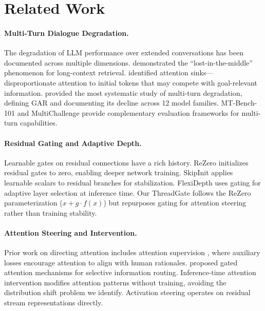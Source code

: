 \documentclass[11pt,a4paper]{article}
\begin{document}
\section{Related Work}
\label{sec:related}

\paragraph{Multi-Turn Dialogue Degradation.}
The degradation of LLM performance over extended conversations has been documented across multiple dimensions.
\citet{liu2024lost} demonstrated the ``lost-in-the-middle'' phenomenon for long-context retrieval.
\citet{xiao2024efficient} identified attention sinks---disproportionate attention to initial tokens that may compete with goal-relevant information.
\citet{dongre2026multiturn} provided the most systematic study of multi-turn degradation, defining GAR and documenting its decline across 12 model families.
MT-Bench-101 \citep{bai2024mtbench101} and MultiChallenge \citep{kamalloo2025multichallenge} provide complementary evaluation frameworks for multi-turn capabilities.

\paragraph{Residual Gating and Adaptive Depth.}
Learnable gates on residual connections have a rich history.
ReZero \citep{bachlechner2021rezero} initializes residual gates to zero, enabling deeper network training.
SkipInit \citep{de2020batch} applies learnable scalars to residual branches for stabilization.
FlexiDepth \citep{luo2025flexidepth} uses gating for adaptive layer selection at inference time.
Our ThreadGate follows the ReZero parameterization ($x + g \cdot f(x)$) but repurposes gating for attention steering rather than training stability.

\paragraph{Attention Steering and Intervention.}
Prior work on directing attention includes attention supervision \citep{liu2016attention}, where auxiliary losses encourage attention to align with human rationales.
\citet{qiu2025gated} proposed gated attention mechanisms for selective information routing.
Inference-time attention intervention \citep{li2023inference} modifies attention patterns without training, avoiding the distribution shift problem we identify.
Activation steering \citep{turner2023activation} operates on residual stream representations directly.
\end{document}
